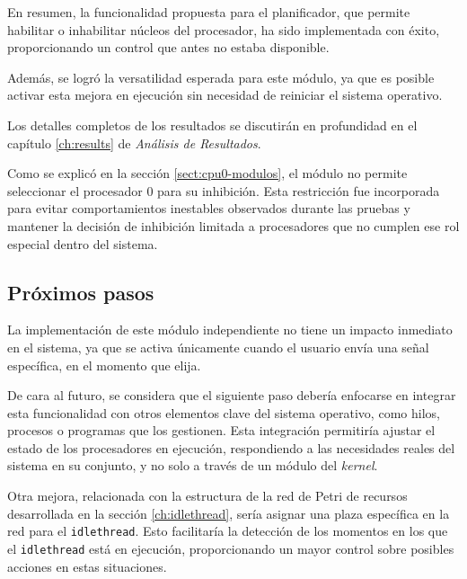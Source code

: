 En resumen, la funcionalidad propuesta para el planificador, que permite habilitar o inhabilitar núcleos del procesador, ha sido implementada con éxito, proporcionando un control que antes no estaba disponible.\par

Además, se logró la versatilidad esperada para este módulo, ya que es posible activar esta mejora en ejecución sin necesidad de reiniciar el sistema operativo.\par

Los detalles completos de los resultados se discutirán en profundidad en el capítulo \ref{ch:results} de \textit{Análisis de Resultados}.\par

Como se explicó en la sección \ref{sect:cpu0-modulos}, el módulo no permite seleccionar el procesador 0 para su inhibición. Esta restricción fue incorporada para evitar comportamientos inestables observados durante las pruebas y mantener la decisión de inhibición limitada a procesadores que no cumplen ese rol especial dentro del sistema.\par

\subsection{Próximos pasos}

La implementación de este módulo independiente no tiene un impacto inmediato en el sistema, ya que se activa únicamente cuando el usuario envía una señal específica, en el momento que elija.\par

De cara al futuro, se considera que el siguiente paso debería enfocarse en integrar esta funcionalidad con otros elementos clave del sistema operativo, como hilos, procesos o programas que los gestionen. Esta integración permitiría ajustar el estado de los procesadores en ejecución, respondiendo a las necesidades reales del sistema en su conjunto, y no solo a través de un módulo del \textit{kernel}.\par

Otra mejora, relacionada con la estructura de la red de Petri de recursos desarrollada en la sección \ref{ch:idlethread}, sería asignar una plaza específica en la red para el \texttt{idlethread}. Esto facilitaría la detección de los momentos en los que el \texttt{idlethread} está en ejecución, proporcionando un mayor control sobre posibles acciones en estas situaciones.\par

